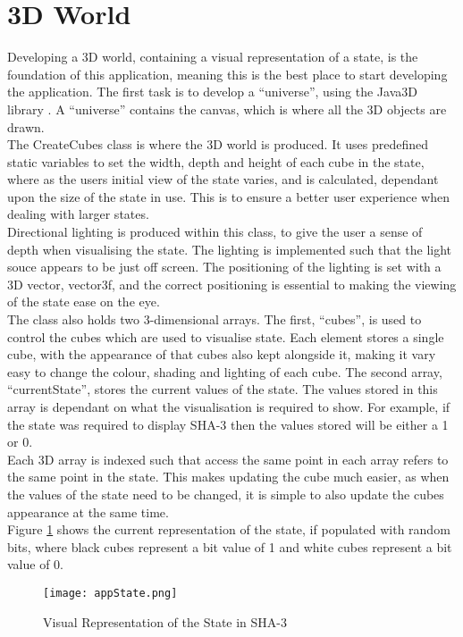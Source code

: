 \section{3D World}
Developing a 3D world, containing a visual representation of a state, is the foundation of this application, meaning this is the best place to start developing the application. The first task is to develop a ``universe'', using the Java3D library . A ``universe'' contains the canvas, which is where all the 3D objects are drawn. 
\vspace{5mm}\\
The CreateCubes class is where the 3D world is produced. It uses predefined static variables to set the width, depth and height of each cube in the state, where as the users initial view of the state varies, and is calculated, dependant upon the size of the state in use. This is to ensure a better user experience when dealing with larger states.
\vspace{5mm}\\
Directional lighting is produced within this class, to give the user a sense of depth when visualising the state. The lighting is implemented such that the light souce appears to be just off screen. The positioning of the lighting is set with a 3D vector, vector3f, and the correct positioning is essential to making the viewing of the state ease on the eye.
\vspace{5mm}\\
The class also holds two 3-dimensional arrays. The first, ``cubes'', is used to control the cubes which are used to visualise state. Each element stores a single cube, with the appearance of that cubes also kept alongside it, making it vary easy to change the colour, shading and lighting of each cube. The second array, ``currentState'', stores the current values of the state. The values stored in this array is dependant on what the visualisation is required to show. For example, if the state was required to display SHA-3 then the values stored will be either a 1 or 0.
\vspace{5mm}\\
 Each 3D array is indexed such that access the same point in each array refers to the same point in the state. This makes updating the cube much easier, as when the values of the state need to be changed, it is simple to also update the cubes appearance at the same time.
\vspace{5mm}\\
Figure \ref{fig:appState} shows the current representation of the state, if populated with random bits, where black cubes represent a bit value of 1 and white cubes represent a bit value of 0.
\begin{figure}[h!]
\centering
\texttt{[image: appState.png]}
    \caption{Visual Representation of the State in SHA-3}
    \label{fig:appState}
\end{figure}
